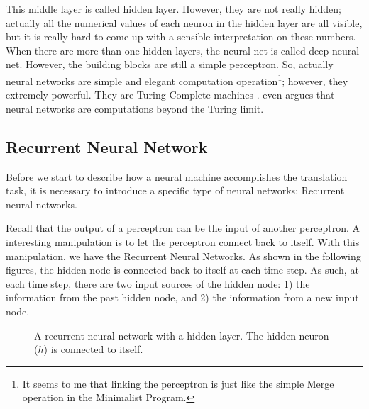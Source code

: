 \documentclass[final]{ua-thesis}
\numberwithin{equation}{section}
\begin{document}
This middle layer is called hidden layer. However, they are not really hidden; actually all the numerical values of each neuron in the hidden layer are all visible, but it is really hard to come up with a sensible interpretation on these numbers.  
When there are more than one hidden layers, the neural net is called deep neural net. However, the building blocks are still a simple perceptron. So, actually neural networks are simple and elegant computation operation\footnote{It seems to me that linking the perceptron is just like the simple Merge operation in the Minimalist Program.}; 
however, they extremely powerful. They are Turing-Complete machines \citep{siegelmann1991turing, graves2014neural}. \citet{siegelmann2003neural, siegelmann2012neural} even argues that neural networks are computations beyond the Turing limit. 



\subsection{Recurrent Neural Network}

Before we start to describe how a neural machine accomplishes the translation task, it is necessary to introduce a specific type of neural networks: Recurrent neural networks. 

Recall that the output of a perceptron can be the input of another perceptron. A interesting manipulation is to let the perceptron connect back to itself. With this manipulation, we have the Recurrent Neural Networks. As shown in the following figures, the hidden node is connected back to itself at each time step. As such, at each time step, there are two input sources of the hidden node: 1) the information from the past hidden node, and 2) the information from a new input node.       

\begin{figure}[h]
\caption{A recurrent neural network with a hidden layer. The hidden neuron ($h$) is connected to itself.}
\label{fig:rnn1}
\centering
{}
\end{figure}
\end{document}
